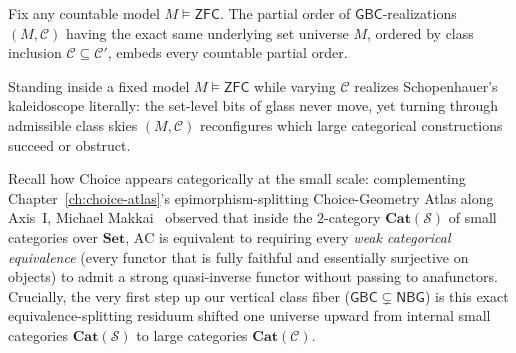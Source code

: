 \begin{theorem}\label{thm:williams-kaleidoscope}%
%
Fix any countable model $M \models \mathsf{ZFC}$. The partial order of $\mathsf{GBC}$-realizations $(M, \mathcal{C})$ having the exact same underlying set universe $M$, ordered by class inclusion $\mathcal{C} \subseteq \mathcal{C}'$, embeds every countable partial order.
\end{theorem}

Standing inside a fixed model $M \models \mathsf{ZFC}$ while varying $\mathcal{C}$ realizes Schopenhauer's kaleidoscope literally: the set-level bits of glass never move, yet turning through admissible class skies $(M, \mathcal{C})$ reconfigures which large categorical constructions succeed or obstruct.

Recall how Choice appears categorically at the small scale: complementing Chapter~\ref{ch:choice-atlas}'s epimorphism-splitting Choice-Geometry Atlas along Axis~I, Michael Makkai~\cite{Makkai96} observed that inside the $2$-category $\mathbf{Cat}(\mathcal{S})$ of small categories over $\mathbf{Set}$, $\mathrm{AC}$ is equivalent to requiring every \emph{weak categorical equivalence} (every functor that is fully faithful and essentially surjective on objects) to admit a strong quasi-inverse functor without passing to anafunctors. Crucially, the very first step up our vertical class fiber ($\mathsf{GBC} \subsetneq \mathsf{NBG}$) is this exact equivalence-splitting residuum shifted one universe upward from internal small categories $\mathbf{Cat}(\mathcal{S})$ to large categories $\mathbf{Cat}(\mathcal{C})$.

